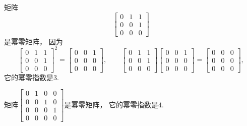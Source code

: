 \begin{example}
矩阵\begin{equation*}
	\begin{bmatrix}
		0 & 1 & 1 \\
		0 & 0 & 1 \\
		0 & 0 & 0
	\end{bmatrix}
\end{equation*}是幂零矩阵，
因为\begin{equation*}
	\begin{bmatrix}
		0 & 1 & 1 \\
		0 & 0 & 1 \\
		0 & 0 & 0
	\end{bmatrix}^2
	=
	\begin{bmatrix}
		0 & 0 & 1 \\
		0 & 0 & 0 \\
		0 & 0 & 0
	\end{bmatrix},
	\qquad
	\begin{bmatrix}
		0 & 1 & 1 \\
		0 & 0 & 1 \\
		0 & 0 & 0
	\end{bmatrix}
	\begin{bmatrix}
		0 & 0 & 1 \\
		0 & 0 & 0 \\
		0 & 0 & 0
	\end{bmatrix}
	=
	\begin{bmatrix}
		0 & 0 & 0 \\
		0 & 0 & 0 \\
		0 & 0 & 0
	\end{bmatrix},
\end{equation*}
它的幂零指数是\(3\).
\end{example}
\begin{example}
矩阵\(
	\begin{bmatrix}
		0 & 1 & 0 & 0 \\
		0 & 0 & 1 & 0 \\
		0 & 0 & 0 & 1 \\
		0 & 0 & 0 & 0
	\end{bmatrix}
\)是幂零矩阵，
它的幂零指数是\(4\).
\end{example}

